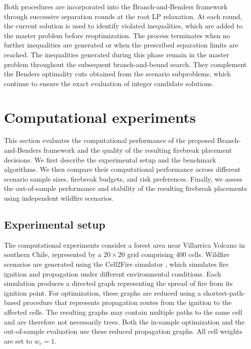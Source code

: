 \documentclass[a4paper,fleqn]{cas-sc}
\begin{document}
Both procedures are incorporated into the Branch-and-Benders framework through successive separation rounds at the root LP relaxation. At each round, the current solution is used to identify violated inequalities, which are added to the master problem before reoptimization. The process terminates when no further inequalities are generated or when the
prescribed separation limits are reached. The inequalities generated during this phase remain in the master problem throughout the subsequent branch-and-bound search. They complement the Benders optimality cuts obtained from the scenario subproblems, which continue to ensure the exact evaluation of integer candidate solutions.


\section{Computational experiments}\label{sec:computational}
This section evaluates the computational performance of the proposed Branch-and-Benders framework and the quality of the resulting firebreak placement decisions. We first describe the experimental setup and the benchmark algorithms. We then compare their computational performance across different scenario sample sizes, firebreak budgets, and risk preferences. Finally, we assess the out-of-sample performance and stability of the resulting firebreak placements using independent wildfire scenarios.

\subsection{Experimental setup}
\label{sec:compared}

The computational experiments consider a forest area near Villarrica
Volcano in southern Chile, represented by a $20\times20$ grid comprising
400 cells. Wildfire scenarios are generated using the Cell2Fire simulator
\citep{pais2021cell2fire}, which simulates fire ignition and propagation
under different environmental conditions. Each simulation produces a
directed graph representing the spread of fire from its ignition point.
For optimization, these graphs are reduced using a shortest-path-based
procedure that represents propagation routes from the ignition to the
affected cells. The resulting graphs may contain multiple paths to the
same cell and are therefore not necessarily trees. Both the in-sample optimization and the out-of-sample evaluation use these reduced propagation graphs. All cell weights are set to $w_v=1$.
\end{document}
